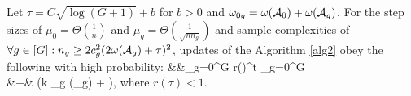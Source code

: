 \begin{theorem}
	\label{theo:step}		
	Let $\tau = C\sqrt{\log(G+1)} + b$ for $b > 0$ and $\omega_{0g} = \omega({\cal A}_0) + \omega({\cal A}_g)$. For the step sizes of $\mu_0 = \Theta(\frac{1}{n})$ and $\mu_g = \Theta(\frac{1}{\sqrt{nn_g}})$ and sample complexities of $\forall g \in [G]: n_g \geq 2c_g^2 (2 \omega({\cal A}_g) + \tau)^2$, updates of the Algorithm \ref{alg2} obey the following with high probability: %
	{\small \be
	\nr
	&&\sum_{g=0}^{G}  
	\leq r(\tau)^t \sum_{g=0}^{G}     \\ \nr
	&+&   \left(\zeta k \max_{g \in [G]} \omega(\cA_g) + \tau \right),
	\ee }
	where $r(\tau) < 1$.%
	
\end{theorem}

